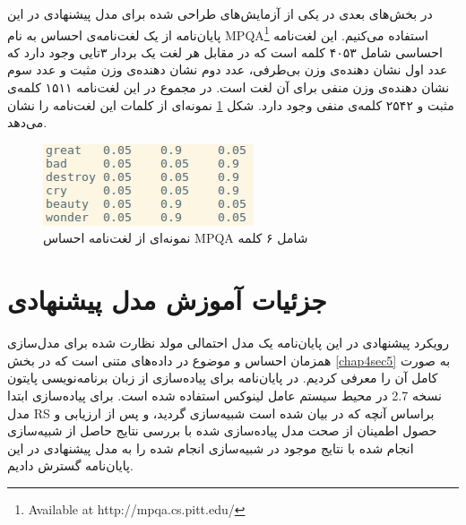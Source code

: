 در بخش‌های بعدی در یکی‌ از آزمایش‌های طراحی شده برای مدل پیشنهادی در این پایان‌‌نامه از یک لغت‌نامه‌ی احساس به نام
MPQA\footnote{Available at http://mpqa.cs.pitt.edu/}
استفاده می‌‌کنیم. این لغت‌نامه احساسی‌ شامل ۴۰۵۳ کلمه است که در مقابل هر لغت یک بردار ۳تایی‌ وجود دارد که عدد اول نشان دهنده‌ی وزن بی‌طرفی، عدد دوم نشان دهنده‌ی وزن مثبت و عدد سوم نشان دهنده‌ی وزن منفی‌ برای آن لغت است. در مجموع در این لغت‌نامه ۱۵۱۱ کلمه‌ی مثبت و ۲۵۴۲ کلمه‌ی منفی‌ وجود دارد. شکل
\ref{chap5-fig2}
نمونه‌ای از کلمات این لغت‌نامه را نشان می‌‌دهد.
\begin{figure}[!b]
	\centering
	\includegraphics[scale=0.7]{chap5-img/lex-example}
	\caption{نمونه‌ای از لغت‌نامه احساس MPQA شامل ۶ کلمه}
	\label{chap5-fig2}
\end{figure}

\section{جزئیات آموزش مدل پیشنهادی}
\label{chap5sec6}
رويکرد پيشنهادی در اين پایان‌‌نامه يک مدل احتمالی مولد نظارت شده برای مدل‌سازی همزمان احساس و موضوع در داده‌های متنی است که در بخش
\ref{chap4sec5}
به صورت کامل آن را معرفی کردیم. در پایان‌‌نامه برای پياده‌سازی از زبان برنامه‌نويسی پایتون نسخه 2.7 در محيط سيستم عامل لينوکس استفاده شده است. برای پیاده‌سازی ابتدا مدل 
RS
براساس آنچه که در 
\cite{hinton2009replicated}
بيان شده است شبيه‌سازی گرديد، و پس از ارزیابی  و حصول اطمینان از صحت مدل پياده‌سازی شده با بررسی نتايج حاصل از شبيه‌سازی انجام شده با نتايج موجود در 
\cite{hinton2009replicated}
شبيه‌سازی انجام شده را به مدل پيشنهادی در اين پایان‌‌نامه گسترش داديم.


